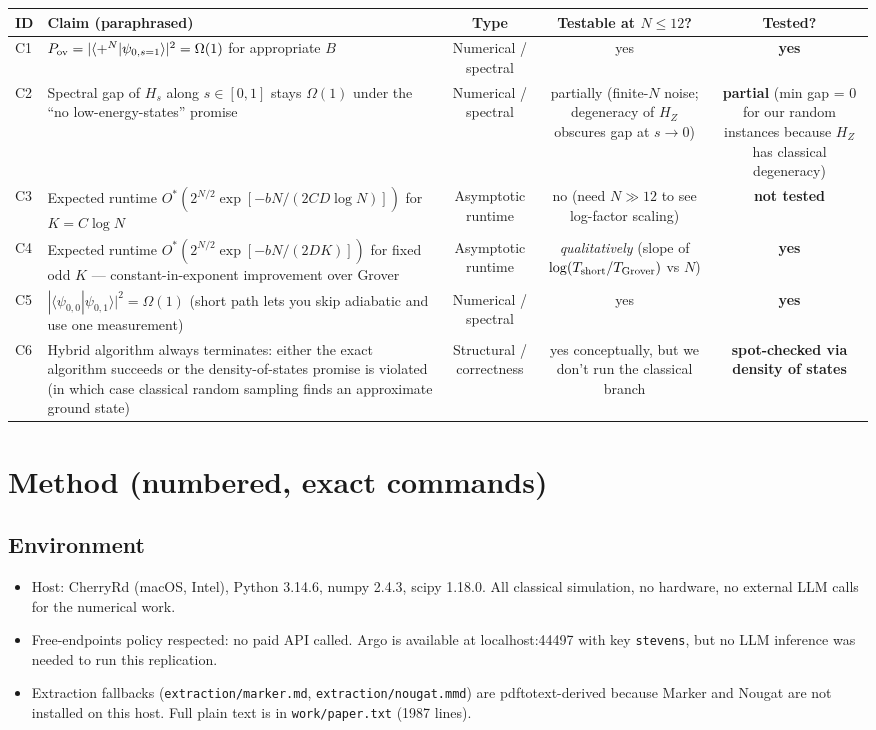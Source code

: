 \documentclass[11pt]{article}
\begin{document}
\begin{longtable}{lp{6.5cm}ccc}
\toprule
ID & Claim (paraphrased) & Type & Testable at $N\le 12$? & Tested? \\
\midrule
C1 & $P_{\rm ov} = |\langle +^N | \psi_{0,s=1}\rangle|^2 = \Omega(1)$ for appropriate $B$ & Numerical / spectral & yes & \textbf{yes} \\
C2 & Spectral gap of $H_s$ along $s\in[0,1]$ stays $\Omega(1)$ under the ``no low-energy-states'' promise & Numerical / spectral & partially (finite-$N$ noise; degeneracy of $H_Z$ obscures gap at $s\to 0$) & \textbf{partial} (min gap = 0 for our random instances because $H_Z$ has classical degeneracy) \\
C3 & Expected runtime $O^*(2^{N/2}\exp[-bN/(2CD\log N)])$ for $K = C\log N$ & Asymptotic runtime & no (need $N \gg 12$ to see log-factor scaling) & \textbf{not tested} \\
C4 & Expected runtime $O^*(2^{N/2}\exp[-bN/(2DK)])$ for fixed odd $K$ --- constant-in-exponent improvement over Grover & Asymptotic runtime & \emph{qualitatively} (slope of $\log(T_{\rm short}/T_{\rm Grover})$ vs $N$) & \textbf{yes} \\
C5 & $|\langle\psi_{0,0}|\psi_{0,1}\rangle|^2 = \Omega(1)$ (short path lets you skip adiabatic and use one measurement) & Numerical / spectral & yes & \textbf{yes} \\
C6 & Hybrid algorithm always terminates: either the exact algorithm succeeds or the density-of-states promise is violated (in which case classical random sampling finds an approximate ground state) & Structural / correctness & yes conceptually, but we don't run the classical branch & \textbf{spot-checked via density of states} \\
\bottomrule
\end{longtable}

\section{Method (numbered, exact commands)}

\subsection*{Environment}

\begin{itemize}
\item Host: CherryRd (macOS, Intel), Python 3.14.6, numpy 2.4.3, scipy 1.18.0. All classical simulation, no hardware, no external LLM calls for the numerical work.
\item Free-endpoints policy respected: no paid API called. Argo is available at localhost:44497 with key \texttt{stevens}, but no LLM inference was needed to run this replication.
\item Extraction fallbacks (\texttt{extraction/marker.md}, \texttt{extraction/nougat.mmd}) are pdftotext-derived because Marker and Nougat are not installed on this host. Full plain text is in \texttt{work/paper.txt} (1987 lines).
\end{itemize}
\end{document}
